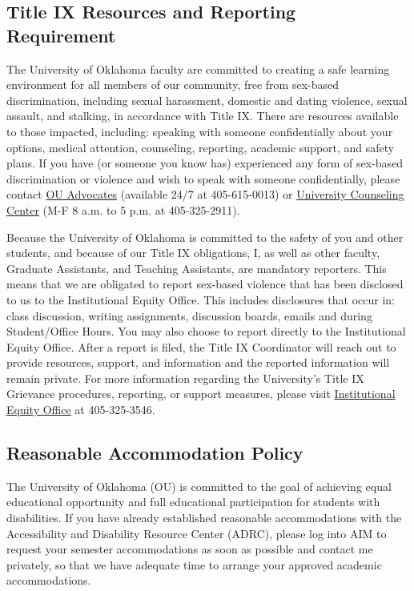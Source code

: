 \documentclass[11pt,english]{article}
\begin{document}
\subsection*{Title IX Resources and Reporting Requirement}

The University of Oklahoma faculty are committed to creating a safe learning environment for all members of our community, free from sex-based discrimination, including sexual harassment, domestic and dating violence, sexual assault, and stalking, in accordance with Title IX. There are resources available to those impacted, including: speaking with someone confidentially about your options, medical attention, counseling, reporting, academic support, and safety plans. If you have (or someone you know has) experienced any form of sex-based discrimination or violence and wish to speak with someone confidentially, please contact \href{https://www.ou.edu/advocacyandeducation/ou-advocates}{OU Advocates} (available 24/7 at 405-615-0013) or \href{http://ou.edu/ucc}{University Counseling Center} (M-F 8 a.m. to 5 p.m. at 405-325-2911).

Because the University of Oklahoma is committed to the safety of you and other students, and because of our Title IX obligations, I, as well as other faculty, Graduate Assistants, and Teaching Assistants, are mandatory reporters. This means that we are obligated to report sex-based violence that has been disclosed to us to the Institutional Equity Office. This includes disclosures that occur in: class discussion, writing assignments, discussion boards, emails and during Student/Office Hours. You may also choose to report directly to the Institutional Equity Office. After a report is filed, the Title IX Coordinator will reach out to provide resources, support, and information and the reported information will remain private. For more information regarding the University's Title IX Grievance procedures, reporting, or support measures, please visit \href{https://www.ou.edu/eoo}{Institutional Equity Office} at 405-325-3546.

\subsection*{Reasonable Accommodation Policy}

The University of Oklahoma (OU) is committed to the goal of achieving equal educational opportunity and full educational participation for students with disabilities. If you have already established reasonable accommodations with the Accessibility and Disability Resource Center (ADRC), please log into AIM to request your semester accommodations as soon as possible and contact me privately, so that we have adequate time to arrange your approved academic accommodations.
\end{document}
